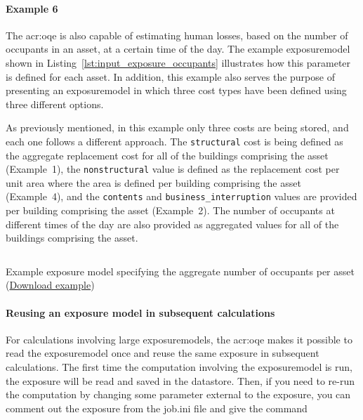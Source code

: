 \paragraph{Example 6}

The \glsdesc{acr:oqe} is also capable of estimating human losses, based on the
number of occupants in an \gls{asset}, at a certain time of the day. The example
\gls{exposuremodel} shown in Listing~\ref{lst:input_exposure_occupants} illustrates
how this parameter is defined for each \gls{asset}. In addition, this example also
serves the purpose of presenting an \gls{exposuremodel} in which three cost
types have been defined using three different options.

As previously mentioned, in this example only three costs are being stored,
and each one follows a different approach. The \Verb+structural+ cost is being
defined as the aggregate replacement cost for all of the buildings comprising
the asset (Example~1), the \Verb+nonstructural+ value is defined as the
replacement cost per unit area where the area is defined per building
comprising the \gls{asset} (Example~4), and the \Verb+contents+ and
\Verb+business_interruption+ values are provided per building comprising the
\gls{asset} (Example~2). The number of occupants at different times of the day are
also provided as aggregated values for all of the buildings comprising the
\gls{asset}.

\begin{listing}[htbp]
  \inputminted[firstline=1,firstnumber=1,fontsize=\footnotesize,frame=single,linenos,bgcolor=lightgray]{xml}{oqum/risk/Verbatim/input_exposure_occupants.xml}
  \caption{Example exposure model specifying the aggregate number of occupants per asset (\href{https://raw.githubusercontent.com/GEMScienceTools/oq-engine-docs/master/oqum/risk/verbatim/input_exposure_occupants.xml}{Download example})}
  \label{lst:input_exposure_occupants}
\end{listing}


\paragraph{Reusing an exposure model in subsequent calculations}

For calculations involving large \glspl{exposuremodel}, the \glsdesc{acr:oqe}
makes it possible to read the \gls{exposuremodel} once and reuse the same
exposure in subsequent calculations. The first time the computation involving
the \gls{exposuremodel} is run, the exposure will be read and saved in the
datastore. Then, if you need to re-run the computation by changing some
parameter external to the exposure, you can comment out the exposure from the
job.ini file and give the command

